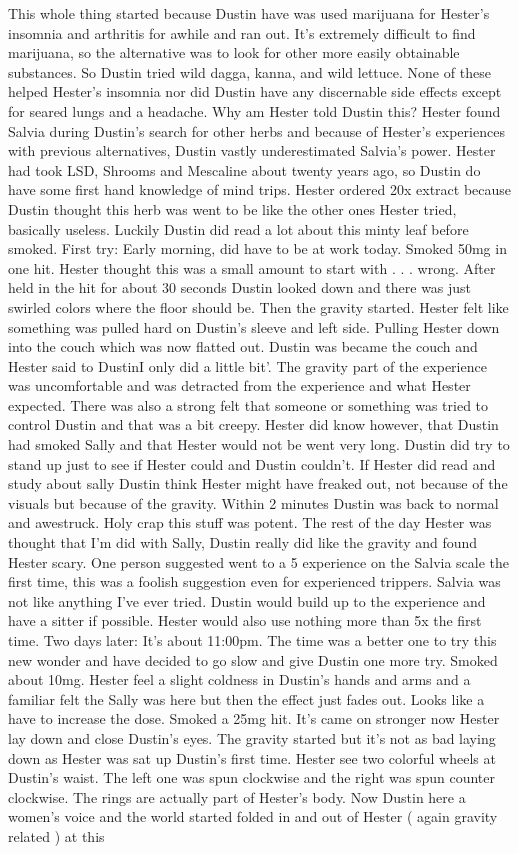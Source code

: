 \documentclass[12pt]{book}
\begin{document}
This whole thing started because Dustin have was used marijuana for Hester's insomnia and arthritis for awhile and ran out. It's extremely difficult to find marijuana, so the alternative was to look for other more easily obtainable substances. So Dustin tried wild dagga, kanna, and wild lettuce. None of these helped Hester's insomnia nor did Dustin have any discernable side effects except for seared lungs and a headache. Why am Hester told Dustin this? Hester found Salvia during Dustin's search for other herbs and because of Hester's experiences with previous alternatives, Dustin vastly underestimated Salvia's power. Hester had took LSD, Shrooms and Mescaline about twenty years ago, so Dustin do have some first hand knowledge of mind trips. Hester ordered 20x extract because Dustin thought this herb was went to be like the other ones Hester tried, basically useless. Luckily Dustin did read a lot about this minty leaf before smoked. First try: Early morning, did have to be at work today. Smoked 50mg in one hit. Hester thought this was a small amount to start with  . . .  wrong. After held in the hit for about 30 seconds Dustin looked down and there was just swirled colors where the floor should be. Then the gravity started. Hester felt like something was pulled hard on Dustin's sleeve and left side. Pulling Hester down into the couch which was now flatted out. Dustin was became the couch and Hester said to DustinI only did a little bit'. The gravity part of the experience was uncomfortable and was detracted from the experience and what Hester expected. There was also a strong felt that someone or something was tried to control Dustin and that was a bit creepy. Hester did know however, that Dustin had smoked Sally and that Hester would not be went very long. Dustin did try to stand up just to see if Hester could and Dustin couldn't. If Hester did read and study about sally Dustin think Hester might have freaked out, not because of the visuals but because of the gravity. Within 2 minutes Dustin was back to normal and awestruck. Holy crap this stuff was potent. The rest of the day Hester was thought that I'm did with Sally, Dustin really did like the gravity and found Hester scary. One person suggested went to a 5 experience on the Salvia scale the first time, this was a foolish suggestion even for experienced trippers. Salvia was not like anything I've ever tried. Dustin would build up to the experience and have a sitter if possible. Hester would also use nothing more than 5x the first time. Two days later: It's about 11:00pm. The time was a better one to try this new wonder and have decided to go slow and give Dustin one more try. Smoked about 10mg. Hester feel a slight coldness in Dustin's hands and arms and a familiar felt the Sally was here but then the effect just fades out. Looks like a have to increase the dose. Smoked a 25mg hit. It's came on stronger now Hester lay down and close Dustin's eyes. The gravity started but it's not as bad laying down as Hester was sat up Dustin's first time. Hester see two colorful wheels at Dustin's waist. The left one was spun clockwise and the right was spun counter clockwise. The rings are actually part of Hester's body. Now Dustin here a women's voice and the world started folded in and out of Hester ( again gravity related ) at this 
\end{document}
